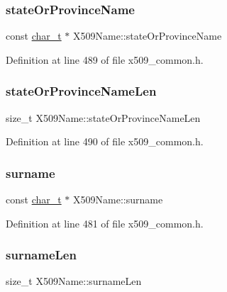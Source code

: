 \subsubsection{\texorpdfstring{state\+Or\+Province\+Name}{stateOrProvinceName}}
{\footnotesize\ttfamily const \hyperlink{compiler__port_8h_a40bb5262bf908c328fbcfbe5d29d0201}{char\+\_\+t} $\ast$ X509\+Name\+::state\+Or\+Province\+Name}



Definition at line 489 of file x509\+\_\+common.\+h.

\mbox{\label{structX509Name_a976a693703efcb68deed5c6294d0c95e}} 
\subsubsection{\texorpdfstring{state\+Or\+Province\+Name\+Len}{stateOrProvinceNameLen}}
{\footnotesize\ttfamily size\+\_\+t X509\+Name\+::state\+Or\+Province\+Name\+Len}



Definition at line 490 of file x509\+\_\+common.\+h.

\mbox{\label{structX509Name_aa9a667195b0076689e31a6995d925cc0}} 
\subsubsection{\texorpdfstring{surname}{surname}}
{\footnotesize\ttfamily const \hyperlink{compiler__port_8h_a40bb5262bf908c328fbcfbe5d29d0201}{char\+\_\+t} $\ast$ X509\+Name\+::surname}



Definition at line 481 of file x509\+\_\+common.\+h.

\mbox{\label{structX509Name_a43f4016488337cbd57078b9b51720645}} 
\subsubsection{\texorpdfstring{surname\+Len}{surnameLen}}
{\footnotesize\ttfamily size\+\_\+t X509\+Name\+::surname\+Len}



